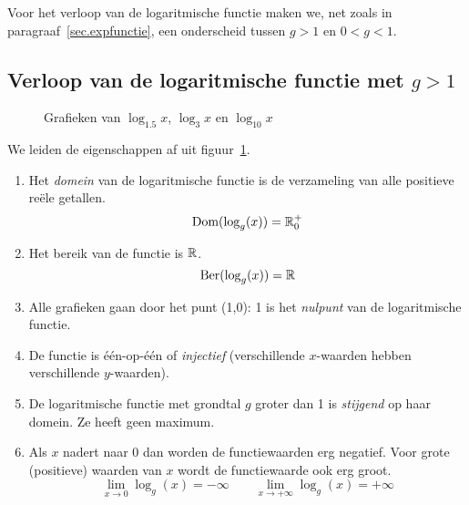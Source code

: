 Voor het verloop van de logaritmische functie maken
we, net zoals in paragraaf~\ref{sec.expfunctie}, een onderscheid
tussen $g>1$ en $0<g<1$.

\subsection[Verloop van de logaritmische functie met $g>1$]
{Verloop van de logaritmische functie met
\boldmath$g>1$\unboldmath} \label{sec:logfuncgroter1}

\begin{figure}[htbp]
    \centering
    \caption{Grafieken van $\log_{1.5}x$, $\log_3x$ en $\log_{10}x$}
    \label{fig:loggroter1}
\end{figure}
We leiden de eigenschappen af uit figuur~\ref{fig:loggroter1}.
\begin{enumerate}
     \item  Het \emph{domein} van de logaritmische functie is de verzameling van alle
    positieve re\"{e}le getallen. 
    \[
      \text{Dom}(\log_g(x))=\mathbb{R}^{+}_{0}
    \]

    \item  Het bereik van de functie is $\mathbb{R}$. 
    \[
      \text{Ber}(\log_g(x))=\mathbb{R}
    \]
   \item  Alle grafieken gaan door het punt (1,0): 1 is het \emph{nulpunt}
    van de logaritmische functie.

    \item  De functie is  één-op-één of \emph{injectief} (verschillende $x$-waarden hebben verschillende $y$-waarden).
    \item  De logaritmische functie met grondtal $g$ groter dan 1 is \emph{stijgend} op haar domein. Ze heeft geen maximum.


    \item  Als $x$ nadert naar 0 dan worden de functiewaarden erg negatief. Voor grote (positieve) waarden van $x$ wordt de functiewaarde ook erg groot.
    \[
    \lim_{x\rightarrow0}\log_g(x)=-\infty \qquad \lim_{x\rightarrow+\infty}\log_g(x)=+\infty
    \]
\end{enumerate}

